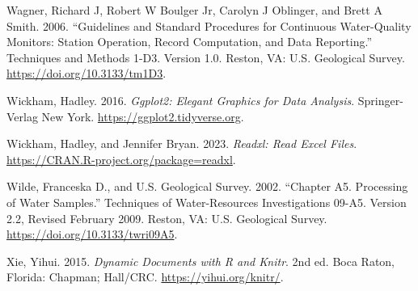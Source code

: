 \begin{CSLReferences}{1}{0}
\leavevmode{}%
Wagner, Richard J, Robert W Boulger Jr, Carolyn J Oblinger, and Brett A Smith. 2006. {``Guidelines and Standard Procedures for Continuous Water-Quality Monitors: Station Operation, Record Computation, and Data Reporting.''} Techniques and Methods 1-D3. Version 1.0. Reston, VA: U.S. Geological Survey. \url{https://doi.org/10.3133/tm1D3}.

\leavevmode{}%
Wickham, Hadley. 2016. \emph{Ggplot2: Elegant Graphics for Data Analysis}. Springer-Verlag New York. \url{https://ggplot2.tidyverse.org}.

\leavevmode{}%
Wickham, Hadley, and Jennifer Bryan. 2023. \emph{Readxl: Read Excel Files}. \url{https://CRAN.R-project.org/package=readxl}.

\leavevmode{}%
Wilde, Franceska D., and U.S. Geological Survey. 2002. {``Chapter A5. Processing of Water Samples.''} Techniques of Water-Resources Investigations 09-A5. Version 2.2, Revised February 2009. Reston, VA: U.S. Geological Survey. \url{https://doi.org/10.3133/twri09A5}.

\leavevmode{}%
Xie, Yihui. 2015. \emph{Dynamic Documents with {R} and Knitr}. 2nd ed. Boca Raton, Florida: Chapman; Hall/CRC. \url{https://yihui.org/knitr/}.

\end{CSLReferences}



\address{%
Marcus W. Beck\\
Tampa Bay Estuary Program\\%
263 13th Ave S\\ St.~Petersburg, Florida, USA 33701\\
%
\url{https://tbep.org}\\%
\textit{ORCiD: \href{https://orcid.org/0000-0002-4996-0059}{0000-0002-4996-0059}}\\%
\href{mailto:mbeck@tbep.org}{\nolinkurl{mbeck@tbep.org}}%
}

\address{%
Benjamen Wetherill\\
ACASAK Consulting\\%
Boston, Massachusetts, USA\\
%
\url{https://www.acasak.com/}\\%
\textit{ORCiD: \href{https://orcid.org/0000-0002-0912-0225}{0000-0002-0912-0225}}\\%
\href{mailto:bwetherill@acasak.co}{\nolinkurl{bwetherill@acasak.co}}%
}

